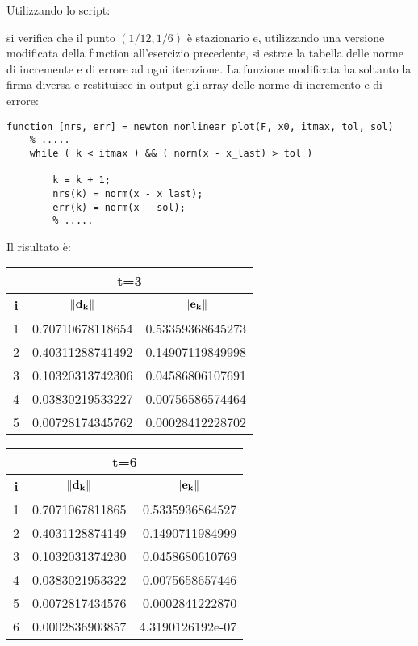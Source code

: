 Utilizzando lo script:

si verifica che il punto $(1/12, 1/6)$ è stazionario e, utilizzando una versione modificata della function all'esercizio precedente, si estrae la tabella delle norme di incremente e di errore ad ogni iterazione.
La funzione modificata ha soltanto la firma diversa e restituisce in output gli array delle norme di incremento e di errore:
\begin{lstlisting}[frame=single]
	function [nrs, err] = newton_nonlinear_plot(F, x0, itmax, tol, sol)
	% .....
	while ( k < itmax ) && ( norm(x - x_last) > tol )
        
        k = k + 1;
        nrs(k) = norm(x - x_last);
        err(k) = norm(x - sol);
      	% .....
\end{lstlisting}
Il risultato è: \\
\begin{tabular}{|c|r|r|}
	\hline
	\multicolumn{3}{|c|}{\textbf{t=3}}\\
	\hline
	\textbf{i} & \multicolumn{1}{c|}{$\norm{\mathbf{d_k}}$} & \multicolumn{1}{c|}{$\norm{\mathbf{e_k}}$}\\
	\hline
    		1  &   0.70710678118654  &    0.53359368645273  \\
     		2  &   0.40311288741492  &    0.14907119849998  \\
     		3  &   0.10320313742306  &    0.04586806107691  \\
     		4  &   0.03830219533227  &    0.00756586574464  \\
     		5  &   0.00728174345762  &    0.00028412228702 \\
	\hline
\end{tabular}
\begin{tabular}{|c|r|r|}
	\hline
	\multicolumn{3}{|c|}{\textbf{t=6}}\\
	\hline
	\textbf{i} & \multicolumn{1}{c|}{$\norm{\mathbf{d_k}}$} & \multicolumn{1}{c|}{$\norm{\mathbf{e_k}}$}\\
	\hline
		1  &    0.7071067811865  &    0.5335936864527  \\
     		2  &    0.4031128874149  &    0.1490711984999  \\
    	 	3  &    0.1032031374230  &    0.0458680610769  \\
     		4  &    0.0383021953322  &    0.0075658657446 \\
     		5  &    0.0072817434576  &    0.0002841222870  \\
	     	6  &    0.0002836903857  &    4.3190126192e-07  \\
	\hline
\end{tabular}